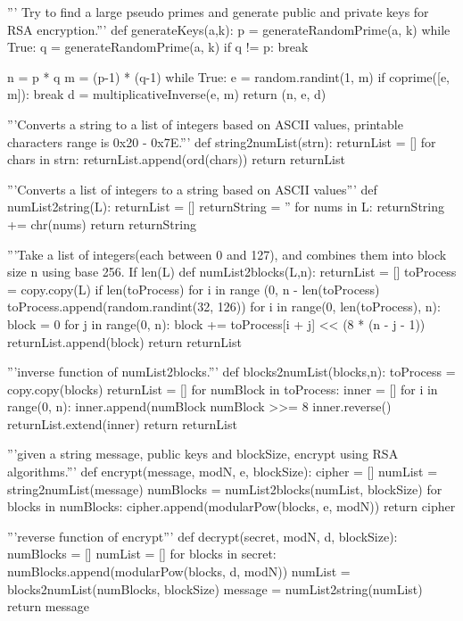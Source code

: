 \documentclass[a4paper,11pt]{article}
\theoremstyle{mytheor}
\begin{document}
''' Try to find a large pseudo primes and generate public and private keys for RSA encryption.'''
def generateKeys(a,k):
    p = generateRandomPrime(a, k)
    while True:
        q = generateRandomPrime(a, k)
        if q != p:
            break
    
    n = p * q
    m = (p-1) * (q-1)
    while True:
        e = random.randint(1, m)
        if coprime([e, m]):
            break
    d = multiplicativeInverse(e, m)
    return (n, e, d)

'''Converts a string to a list of integers based on ASCII values, printable characters range is 0x20 - 0x7E.'''
def string2numList(strn):
    returnList = []
    for chars in strn:
        returnList.append(ord(chars))
    return returnList

'''Converts a list of integers to a string based on ASCII values'''
def numList2string(L):
    returnList = []
    returnString = ''
    for nums in L:
        returnString += chr(nums)
    return returnString

'''Take a list of integers(each between 0 and 127), and combines them into block size n using base 256. If len(L) %
def numList2blocks(L,n):
    returnList = []
    toProcess = copy.copy(L)
    if len(toProcess) %
        for i in range (0, n - len(toProcess) %
            toProcess.append(random.randint(32, 126))
    for i in range(0, len(toProcess), n):
        block = 0
        for j in range(0, n):
            block += toProcess[i + j] << (8 * (n - j - 1))
        returnList.append(block)
    return returnList

'''inverse function of numList2blocks.'''
def blocks2numList(blocks,n):
    toProcess = copy.copy(blocks)
    returnList = []
    for numBlock in toProcess:
        inner = []
        for i in range(0, n):
            inner.append(numBlock %
            numBlock >>= 8
        inner.reverse()
        returnList.extend(inner)
    return returnList

'''given a string message, public keys and blockSize, encrypt using RSA algorithms.'''
def encrypt(message, modN, e, blockSize):
    cipher = []
    numList = string2numList(message)
    numBlocks = numList2blocks(numList, blockSize)
    for blocks in numBlocks:
        cipher.append(modularPow(blocks, e, modN))
    return cipher

'''reverse function of encrypt'''
def decrypt(secret, modN, d, blockSize):
    numBlocks = []
    numList = []
    for blocks in secret:
        numBlocks.append(modularPow(blocks, d, modN))
    numList = blocks2numList(numBlocks, blockSize)
    message = numList2string(numList)
    return message
\end{document}
